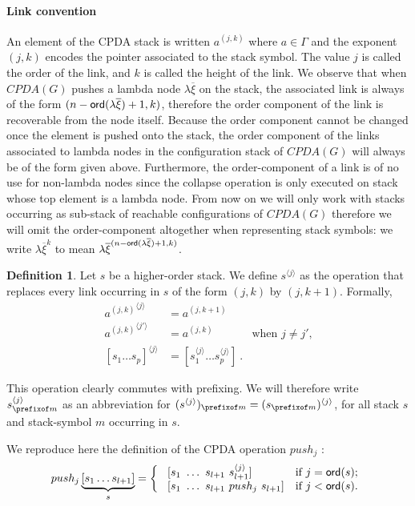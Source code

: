 \documentclass[a4paper,draft]{article}
\theoremstyle{remark}
\theoremstyle{definition}
\newtheorem{definition}{Definition}[section]
\begin{document}
\paragraph{Link convention}
An element of the CPDA stack is written $a^{(j,k)}$ where $a\in \Gamma$ and the exponent $(j,k)$
encodes the pointer associated to the stack symbol. The value $j$ is called the order of the link, and $k$ is called the height of the link. We observe that when $CPDA(G)$ pushes
a lambda node $\lambda \overline{\xi}$ on the stack, the associated link is always of the form $(n-{\sf ord}(\lambda \overline{\xi})+1, k)$, therefore the order component of the link is
recoverable from the node itself. Because the order component cannot be changed once the element is pushed onto the stack, the order component of the links associated to lambda nodes
in the configuration stack of $CPDA(G)$ will always be of the form given above.
Furthermore, the order-component of a link is of no use for non-lambda nodes since the collapse operation is only executed on stack whose top element is a lambda node.
From now on we will only work with stacks occurring as sub-stack of reachable configurations of $CPDA(G)$
therefore we will omit the order-component altogether when representing stack symbols: we write $\lambda \overline{\xi}^{k}$ to mean $\lambda \overline{\xi}^{(n-{\sf ord}(\lambda \overline{\xi})+1,k)}$.




\begin{definition}
Let $s$ be a higher-order stack. We define $s^{\langle j \rangle}$ as the operation that replaces
every link occurring in $s$ of the form $(j,k)$ by $(j,k+1)$. Formally,
\begin{align*}
{a^{(j,k)}}^{\langle j \rangle} &= a^{(j,k+1)}   \\
{a^{(j,k)}}^{\langle j' \rangle} &= a^{(j,k)} &   \mbox{when $j\neq j'$,}\\
[s_1 \ldots s_p]^{\langle j \rangle} &= [s_1^{\langle j \rangle} \ldots s_p^{\langle j \rangle}] \ .
\end{align*}
\end{definition}
This operation clearly commutes with prefixing. We will therefore write $s^{\langle j\rangle}_{\prefixof m}$ as an abbreviation for
$(s^{\langle j\rangle})_{\prefixof m} = (s_{\prefixof m})^{\langle j\rangle}$,
for all stack $s$ and stack-symbol $m$ occurring in $s$.


We reproduce here the definition of the CPDA operation $push_j$ \cite{hmos-lics08}:
$$ push_j \underbrace{[ s_1 \ldots s_{l+1} ]}_{s} =
\left\{
  \begin{array}{ll}
\    [s_1\ \ldots\ s_{l+1}\ s_{l+1}^{\langle j \rangle}]  &\hbox{if $j = {\sf ord}(s)$;}\\
\    [s_1\ \ldots\ s_{l+1}\ push_j\ s_{l+1}]  &\hbox{if $j<{\sf ord}(s)$.}
 \end{array}
\right.
$$
\end{document}
